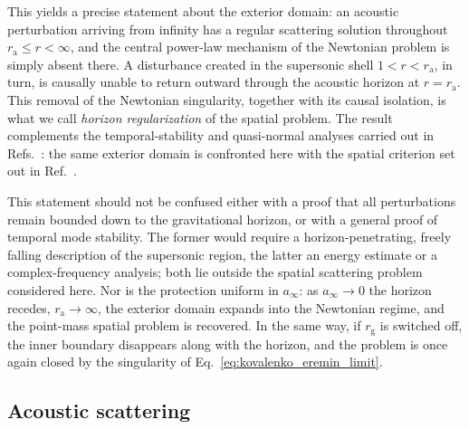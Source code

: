 \documentclass[12pt,a4paper,preprint,nopreprintline]{elsarticle}
\begin{document}
This yields a precise statement about the exterior domain: an acoustic perturbation arriving from infinity has a regular scattering solution throughout $r_{\mathrm{a}}\le r<\infty$, and the central power-law mechanism of the Newtonian problem is simply absent there. A disturbance created in the supersonic shell $1<r<r_{\mathrm{a}}$, in turn, is causally unable to return outward through the acoustic horizon at $r=r_{\mathrm{a}}$. This removal of the Newtonian singularity, together with its causal isolation, is what we call \emph{horizon regularization} of the spatial problem. The result complements the temporal-stability and quasi-normal analyses carried out in Refs.~\cite{MoncriefV_StabilityOfStationarySphericalAccretionOntoASchwarzschildBlackHole_1980,ChaverraE_MoralesMD_SarbachO_QuasinormalAcousticOscillationsInTheMichelFlow_2015}: the same exterior domain is confronted here with the spatial criterion set out in Ref.~\cite{KovalenkoIG_EreminMA_SpatialInstabilityOfSphericalAccretion_1998}.

This statement should not be confused either with a proof that all perturbations remain bounded down to the gravitational horizon, or with a general proof of temporal mode stability. The former would require a horizon-penetrating, freely falling description of the supersonic region, the latter an energy estimate or a complex-frequency analysis; both lie outside the spatial scattering problem considered here. Nor is the protection uniform in $a_{\infty}$: as $a_{\infty}\rightarrow0$ the horizon recedes, $r_{\mathrm{a}}\rightarrow\infty$, the exterior domain expands into the Newtonian regime, and the point-mass spatial problem is recovered. In the same way, if $r_{\mathrm{g}}$ is switched off, the inner boundary disappears along with the horizon, and the problem is once again closed by the singularity of Eq.~\eqref{eq:kovalenko_eremin_limit}.

\subsection{Acoustic scattering}
\label{sec:acoustic_numerics}
\end{document}
